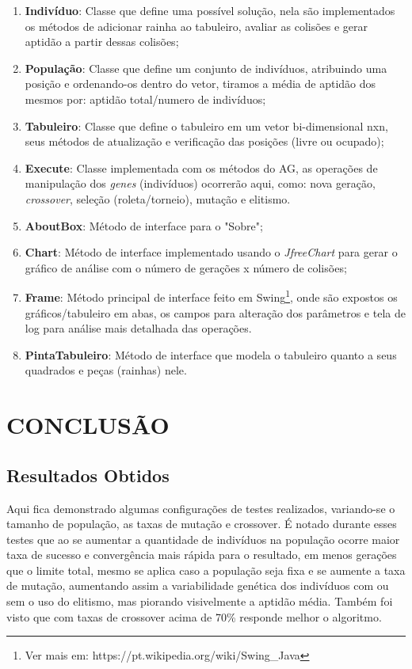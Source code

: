\documentclass[12pt,a4paper]{article}
\begin{document}
\begin{enumerate}
\item \textbf{Indivíduo}: Classe que define uma possível solução, nela são implementados os métodos de adicionar rainha ao tabuleiro, avaliar as colisões e gerar aptidão a partir dessas colisões;
\item \textbf{População}: Classe que define um conjunto de indivíduos, atribuindo uma posição e ordenando-os dentro do vetor, tiramos a média de aptidão dos mesmos por: aptidão total/numero de indivíduos;
\item \textbf{Tabuleiro}: Classe que define o tabuleiro em um vetor bi-dimensional nxn, seus métodos de atualização e verificação das posições (livre ou ocupado);
\item \textbf{Execute}: Classe implementada com os métodos do AG, as operações de manipulação dos \textit{genes} (indivíduos) ocorrerão aqui, como: nova geração, \textit{crossover}, seleção (roleta/torneio), mutação e elitismo.
\item \textbf{AboutBox}: Método de interface para o "Sobre";
\item \textbf{Chart}: Método de interface implementado usando o \textit{JfreeChart} para gerar o gráfico de análise com o número de gerações x número de colisões;
\item \textbf{Frame}: Método principal de interface feito em Swing\footnote{Ver mais em: https://pt.wikipedia.org/wiki/Swing\_Java}, onde são expostos os gráficos/tabuleiro em abas, os campos para alteração dos parâmetros e tela de log para análise mais detalhada das operações.
\item \textbf{PintaTabuleiro}: Método de interface que modela o tabuleiro quanto a seus quadrados e peças (rainhas) nele.


\end{enumerate}


\newpage
\thispagestyle{main}

\section{CONCLUSÃO}

\subsection{Resultados Obtidos}

\hspace{4ex} Aqui fica demonstrado algumas configurações de testes realizados, variando-se o tamanho de população, as taxas de mutação e crossover. É notado durante esses testes que ao se aumentar a quantidade de indivíduos na população ocorre maior taxa de sucesso e convergência mais rápida para o resultado, em menos gerações que o limite total, mesmo se aplica caso a população seja fixa e se aumente a taxa de mutação, aumentando assim a variabilidade genética dos indivíduos com ou sem o uso do elitismo, mas piorando visivelmente a aptidão média. Também foi visto que com taxas de crossover acima de 70\% responde melhor o algoritmo.\\
\end{document}
